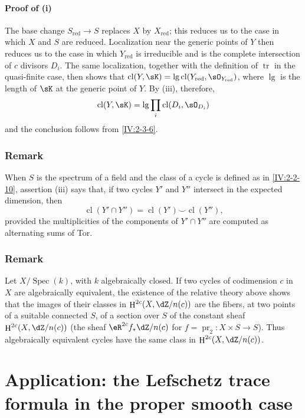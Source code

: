 \documentclass[12pt,oneside,english]{smfbook}
\DeclareMathOperator{\cl}{cl}
\DeclareMathOperator{\h}{H}
\DeclareMathOperator{\spec}{Spec}
\DeclareMathOperator{\tr}{tr}
\begin{document}
\paragraph{Proof of (i)}
The base change $S_\text{red}\to S$ replaces $X$ by $X_\text{red}$; this reduces us to the case in which $X$ and $S$ are reduced. Localization near the generic points of $Y$ then reduces us to the case in which $Y_\text{red}$ is irreducible and is the complete intersection of $c$ divisors $D_i$. The same localization, together with the definition of $\tr$ in the quasi-finite case, then shows that $\cl(Y,\sK)=\operatorname{lg}\cl(Y_\text{red},\sO_{Y_\text{red}})$, where $\operatorname{lg}$ is the length of $\sK$ at the generic point of $Y$. By (iii), therefore,
\[
  \cl(Y,\sK) = \operatorname{lg} \prod_i \cl(D_i,\sO_{D_i})
\]
and the conclusion follows from \ref{IV:2-3-6}.

\subsubsection{Remark}\label{IV:2-3-9}

When $S$ is the spectrum of a field and the class of a cycle is defined as in \ref{IV:2-2-10}, assertion (iii) says that, if two cycles $Y'$ and $Y''$ intersect in the expected dimension, then
\[
  \cl(Y'\cap Y'') = \cl(Y')\smallsmile \cl(Y'')\text{,}
\]
provided the multiplicities of the components of $Y'\cap Y''$ are computed as alternating sums of Tor.

\subsubsection{Remark}\label{IV:2-3-10}

Let $X/\spec(k)$, with $k$ algebraically closed. If two cycles of codimension $c$ in $X$ are algebraically equivalent, the existence of the relative theory above shows that the images of their classes in $\h^{2c}(X,\dZ/n(c))$ are the fibers, at two points of a suitable connected $S$, of a section over $S$ of the constant sheaf $\h^{2c}(X,\dZ/n(c))$ (the sheaf $\eR^{2c}f_*\dZ/n(c)$ for $f=\operatorname{pr}_2:X\times S\to S$). Thus algebraically equivalent cycles have the same class in $\h^{2c}(X,\dZ/n(c))$.

\section{Application: the Lefschetz trace formula in the proper smooth case}\label{IV:3}
\end{document}

